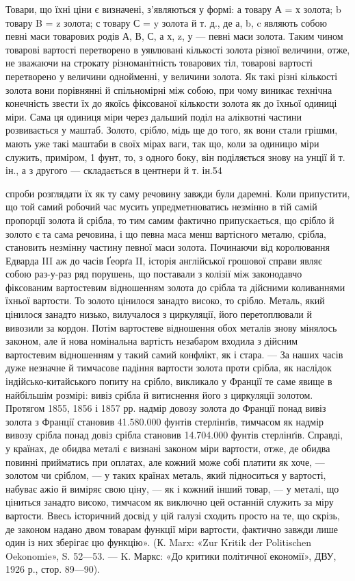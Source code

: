 Товари, що їхні ціни є визначені, з’являються у формі: а товару А = х золота; b товару B = z золота;
с товару С = y золота й т. д., де а, b, c являють собою певні маси товарових родів А, В, С, а х, z,
у — певні маси золота. Таким чином товарові вартості перетворено в уявлювані кількості золота різної
величини, отже, не зважаючи на строкату різноманітність товарових тіл, товарові вартості перетворено
у величини однойменні, у величини золота. Як такі різні кількості золота вони порівнянні й
спільномірні між собою, при чому виникає технічна конечність звести їх до якоїсь фіксованої
кількости золота як до їхньої одиниці міри. Сама ця одиниця міри через дальший поділ на
аліквотні частини розвивається у маштаб. Золото, срібло, мідь ще до того, як вони стали грішми,
мають уже такі маштаби в своїх мірах ваги, так що, коли за одиницю міри служить, приміром, 1 фунт,
то, з одного боку, він поділяється знову на унції й т. ін., а з другого — складається в центнери й
т. ін.54

спроби розглядати їх як ту саму речовину завжди були даремні. Коли припустити, що той самий робочий
час мусить упредметнюватись незмінно в тій самій пропорції золота й срібла, то тим самим фактично
припускається, що срібло й золото є та сама речовина, і що певна маса менш вартісного металю,
срібла, становить незмінну частину певної маси золота. Починаючи від королювання Едварда III аж до
часів Ґеорґа II, історія англійської грошової справи являє собою раз-у-раз ряд порушень, що
поставали з колізії між законодавчо фіксованим вартостевим відношенням
золота до срібла та дійсними коливаннями їхньої вартости. То золото цінилося занадто високо, то
срібло. Металь, який цінилося занадто низько, вилучалося з циркуляції, його перетоплювали й вивозили
за кордон. Потім вартостеве відношення обох металів знову мінялось законом, але й нова номінальна
вартість незабаром входила з дійсним вартостевим відношенням у такий самий конфлікт, як і стара. —
За наших часів дуже
незначне й тимчасове падіння вартости золота проти срібла, як наслідок індійсько-китайського попиту
на срібло, викликало у Франції те саме явище в найбільшім розмірі: вивіз срібла й витиснення його з
циркуляції золотом. Протягом 1855, 1856 і 1857 рр. надмір довозу золота до Франції понад вивіз
золота з Франції становив 41.580.000 фунтів стерлінґів, тимчасом як надмір вивозу срібла понад довіз
срібла становив 14.704.000 фунтів стерлінґів. Справді, у країнах, де обидва металі є визнані законом
міри вартости, отже, де обидва повинні прийматись при оплатах, але кожний може собі платити як хоче,
— золотом чи сріблом, — у таких країнах металь, який підноситься у вартості, набуває ажіо й виміряє
свою ціну, — як і кожний інший товар, — у металі, що ціниться занадто високо, тимчасом як виключно
цей останній служить за міру вартости. Ввесь історичний досвід у цій галузі сходить просто на те, що
скрізь, де законом надано двом товарам функції міри вартости, фактично завжди лише один із них
зберігає цю функцію». (К. Marx: «Zur Kritik der Politischen Oekonomie», S. 52—53. — K. Маркс: «До
критики політичної економії», ДВУ, 1926 р., стор. 89—90).

